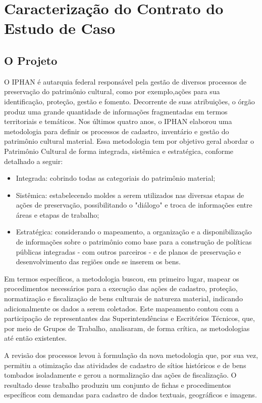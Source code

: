 \section{Caracterização do Contrato do Estudo de Caso}

\subsection{O Projeto}

O IPHAN é autarquia federal responsável pela gestão de diversos processos de preservação do patrimônio cultural, como por exemplo,ações para sua identificação, proteção, gestão e fomento. Decorrente
de suas atribuições, o órgão produz uma grande quantidade de informações fragmentadas em termos territoriais e temáticos. Nos últimos quatro anos, o IPHAN elaborou uma metodologia
para definir os processos de cadastro, inventário e gestão do patrimônio cultural material. Essa metodologia tem por objetivo geral abordar o Patrimônio Cultural de forma integrada, sistêmica
e estratégica, conforme detalhado a seguir:

\begin{itemize}
\item Integrada: cobrindo todas as categoriais do patrimônio material;
\item Sistêmica: estabelecendo moldes a serem utilizados nas diversas etapas de ações de preservação, possibilitando o "diálogo" e troca de informações entre áreas e etapas de trabalho;
\item Estratégica: considerando o mapeamento, a organização e a disponibilização de informações sobre o patrimônio como base para a construção de políticas públicas integradas - com outros parceiros - e de planos de preservação e desenvolvimento das regiões onde se inserem os bens.
\end{itemize}

Em termos específicos, a metodologia buscou, em primeiro lugar, mapear os procedimentos necessários para a execução das ações de cadastro, proteção, normatização e fiscalização de bens culturais de natureza material, indicando adicionalmente os dados a serem coletados. Este mapeamento contou com a participação de representantes das Superintendências e Escritórios Técnicos, que, por meio de Grupos de Trabalho, analisaram, de forma crítica, as metodologias até então existentes.

A revisão dos processos levou à formulação da nova metodologia que, por sua vez, permitiu a otimização das atividades de cadastro de sítios históricos e de bens tombados isoladamente e gerou a normalização das ações de fiscalização. O resultado desse trabalho produziu um conjunto de fichas e procedimentos específicos com demandas para cadastro de dados textuais, geográficos e imagens.

